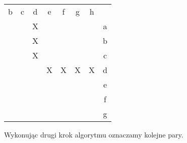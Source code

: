 \documentclass{article}
\begin{document}
    \begin{table}[h!]
        \begin{tabular}{cccccccc}
        b                      & c                     & d                      & e                      & f                      & g                      & h                      &   \\ \cline{1-7}
        \multicolumn{1}{|c|}{} & \multicolumn{1}{c|}{} & \multicolumn{1}{c|}{X} & \multicolumn{1}{c|}{}  & \multicolumn{1}{c|}{}  & \multicolumn{1}{c|}{}  & \multicolumn{1}{c|}{}  & a \\ \cline{1-7}
        \multicolumn{1}{c|}{}  & \multicolumn{1}{c|}{} & \multicolumn{1}{c|}{X} & \multicolumn{1}{c|}{}  & \multicolumn{1}{c|}{}  & \multicolumn{1}{c|}{}  & \multicolumn{1}{c|}{}  & b \\ \cline{2-7}
                               & \multicolumn{1}{c|}{} & \multicolumn{1}{c|}{X} & \multicolumn{1}{c|}{}  & \multicolumn{1}{c|}{}  & \multicolumn{1}{c|}{}  & \multicolumn{1}{c|}{}  & c \\ \cline{3-7}
                               &                       & \multicolumn{1}{c|}{}  & \multicolumn{1}{c|}{X} & \multicolumn{1}{c|}{X} & \multicolumn{1}{c|}{X} & \multicolumn{1}{c|}{X} & d \\ \cline{4-7}
                               &                       &                        & \multicolumn{1}{c|}{}  & \multicolumn{1}{c|}{}  & \multicolumn{1}{c|}{}  & \multicolumn{1}{c|}{}  & e \\ \cline{5-7}
                               &                       &                        &                        & \multicolumn{1}{c|}{}  & \multicolumn{1}{c|}{}  & \multicolumn{1}{c|}{}  & f \\ \cline{6-7}
                               &                       &                        &                        &                        & \multicolumn{1}{c|}{}  & \multicolumn{1}{c|}{}  & g \\ \cline{7-7}
        \end{tabular}
    \end{table}

    Wykonując drugi krok algorytmu oznaczamy kolejne pary.
\end{document}
